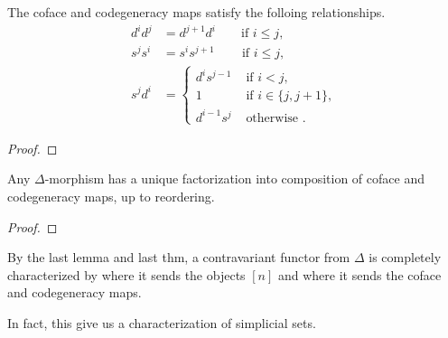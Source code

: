 \begin{theorem}
    The coface and codegeneracy maps satisfy the folloing relationships.
    \begin{align*}
        d^id^j &= d^{j+1} d^i       \qquad\text{if } i\leq j,\\
        s^{j}s^i &= s^i s^{j+1}     \qquad\,\text{if } i\leq j,\\
        s^jd^i &= \begin{cases}
            d^i s^{j-1} &\text{ if } i <j, \\
            1 & \text{ if } i\in \{j,j+1\}, \\
            d^{i-1} s^j & \text{ otherwise }.
        \end{cases}
    \end{align*}
\end{theorem}
\begin{proof}
    
\end{proof}

\begin{lemma}
    Any \(\Delta\)-morphism has a unique factorization into composition of coface and codegeneracy maps, up to reordering.
\end{lemma}
\begin{proof}
    
\end{proof}

By the last lemma and last thm, a contravariant functor from \(\Delta\) is completely characterized by where it sends the objects  \([n]\)   and where it sends the coface and codegeneracy maps.

In fact, this give us a characterization of simplicial sets.

